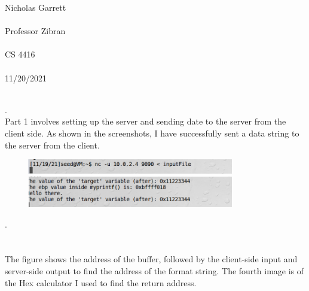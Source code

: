 \documentclass[12pt, a4paper]{article}
\begin{document}
\noindent
Nicholas Garrett\\ \\
Professor Zibran\\ \\
CS 4416\\ \\
11/20/2021\\ \\


\begin{center}
\end{center}

.\\
Part 1 involves setting up the server and sending date to the server from the client side. 
As shown in the screenshots, I have successfully sent a data string to the server from the client.\\ 
\begin{figure}[ht!]
\centering
\includegraphics[width=90mm]{"Capture.png"}
\includegraphics[width=90mm]{"Capture1.png"}  
\end{figure}
.\\ \\ \
\\

The figure shows the address of the buffer, followed by the client-side input and server-side output to find the address of the format string.  The fourth image is of the Hex calculator I used to find the return address.
\end{document}
